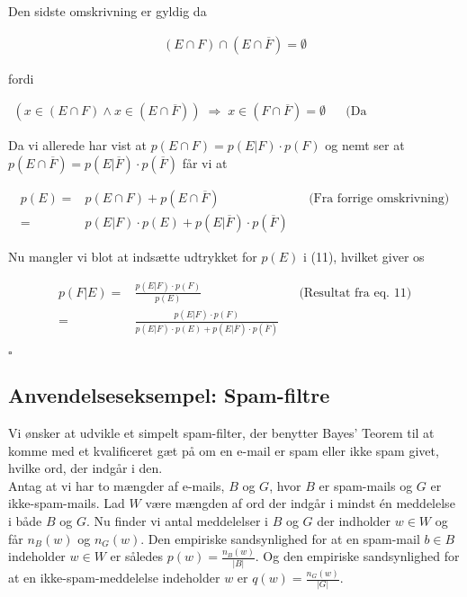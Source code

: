 \documentclass[12pt]{article}
\begin{document}
Den sidste omskrivning er gyldig da 

\begin{align*}
    (E \cap F) \cap (E \cap \overline{F}) = \emptyset
\end{align*}

fordi

\begin{align*}
    (x \in (E \cap F) \wedge x \in (E \cap \overline{F})) \; \Rightarrow \; x \in (F \cap \overline{F}) = \emptyset && \text{(Da fællesmængder)}
\end{align*}

Da vi allerede har vist at $p(E \cap F) = p(E|F) \cdot p(F)$ og nemt ser at $p(E \cap \overline{F}) = p(E|\overline{F}) \cdot p(\overline{F})$ får vi at 

\begin{align*}
    p(E) =&  p(E \cap F) + p(E \cap \overline{F}) && \text{(Fra forrige omskrivning)} \\
    =& p(E|F) \cdot p(E) + p(E|\overline{F}) \cdot p(\overline{F})
\end{align*}

Nu mangler vi blot at indsætte udtrykket for $p(E)$ i (11), hvilket giver os 

\begin{align*}
    p(F|E) =& \frac{p(E|F) \cdot p(F)}{p(E)} && \text{(Resultat fra eq. 11)} \\
    =& \frac{p(E|F) \cdot p(F)}{p(E|F) \cdot p(E) + p(E|\overline{F}) \cdot p(\overline{F})}
\end{align*}

\begin{flushright}
    $\square$
\end{flushright}

\subsection*{Anvendelseseksempel: Spam-filtre}

Vi ønsker at udvikle et simpelt spam-filter, der benytter Bayes' Teorem til at komme med et kvalificeret gæt på om en e-mail er spam eller ikke spam givet, hvilke ord, der indgår i den. \\

Antag at vi har to mængder af e-mails, $B$ og $G$, hvor $B$ er spam-mails og $G$ er ikke-spam-mails. Lad $W$ være mængden af ord der indgår i mindst én meddelelse i både $B$ og $G$. Nu finder vi antal meddelelser i $B$ og $G$ der indholder $w \in W$ og får $n_B(w)$ og $n_G(w)$. Den empiriske sandsynlighed for at en spam-mail $b \in B$ indeholder $w \in W$ er således $p(w) = \frac{n_B(w)}{|B|}$. Og den empiriske sandsynlighed for at en ikke-spam-meddelelse indeholder $w$ er $q(w)=\frac{n_G(w)}{|G|}$. \\
\end{document}
